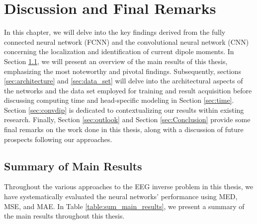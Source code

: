 \documentclass[a4paper, UKenglish, 11pt]{uiomaster}
\begin{document}
\chapter{Discussion and Final Remarks} \label{chap:discussion}
In this chapter, we will delve into the key findings derived from the fully connected neural network (FCNN) and the convolutional neural network (CNN) concerning the localization and identification of current dipole moments. In Section \ref{sec:results}, we will present an overview of the main results of this thesis, emphasizing the most noteworthy and pivotal findings. Subsequently, sections \ref{sec:architecture} and \ref{sec:data_set} will delve into the architectural aspects of the networks and the data set employed for training and result acquisition before discussing computing time and head-specific modeling in Section \ref{sec:time}. Section \ref{sec:convdip} is dedicated to contextualizing our results within existing research. Finally, Section \ref{sec:outlook} and Section \ref{sec:Conclusion} provide some final remarks on the work done in this thesis, along with a discussion of future prospects following our approaches.

\section{Summary of Main Results} \label{sec:results}
Throughout the various approaches to the EEG inverse problem in this thesis, we have systematically evaluated the neural networks' performance using MED, MSE, and MAE. In Table \ref{table:sum_main_results}, we present a summary of the main results throughout this thesis.
\end{document}

